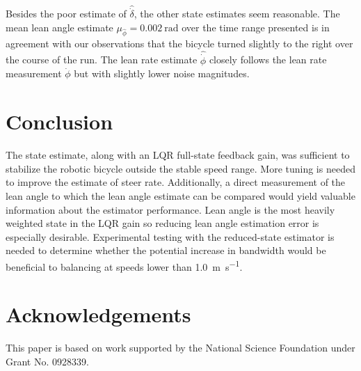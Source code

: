 \documentclass[letterpaper,11pt]{article}
\begin{document}
Besides the poor estimate of $\hat{\dot{\delta}}$, the other state estimates
seem reasonable.  The mean lean angle estimate $\mu_{\hat{\phi}} =
\SI{0.002}{\radian}$ over the time range presented is in agreement with our
observations that the bicycle turned slightly to the right over the course of
the run. The lean rate estimate $\hat{\dot{\phi}}$ closely follows the lean
rate measurement $\dot{\phi}$ but with slightly lower noise magnitudes.

\section{Conclusion} \label{sec:conclusion}
The state estimate, along with an LQR full-state feedback gain, was sufficient
to stabilize the robotic bicycle outside the stable speed range. More tuning is
needed to improve the estimate of steer rate. Additionally, a direct
measurement of the lean angle to which the lean angle estimate can be compared
would yield valuable information about the estimator performance. Lean angle is
the most heavily weighted state in the LQR gain so reducing lean angle
estimation error is especially desirable. Experimental testing with the
reduced-state estimator is needed to determine whether the potential increase
in bandwidth would be beneficial to balancing at speeds lower than
\SI{1.0}{\m\per\s}.

\section{Acknowledgements}
This paper is based on work supported by the National Science Foundation under
Grant No. 0928339.

\printbibliography
\end{document}
